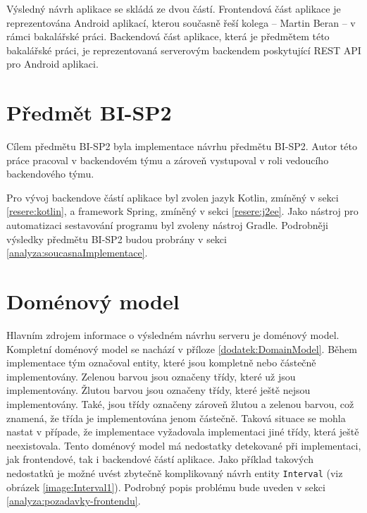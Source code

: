     Výsledný návrh aplikace se skládá ze dvou částí. Frontendová část aplikace je reprezentována Android aplikací, kterou současně řeší kolega -- Martin Beran -- v rámci bakalářské práci. Backendová část aplikace, která je předmětem této bakalářské práci, je reprezentovaná serverovým backendem poskytující REST API pro Android aplikaci.


\section{Předmět BI-SP2}\label{analyza:navrh:sp2}
    Cílem předmětu BI-SP2 byla implementace návrhu předmětu BI-SP2. Autor této práce pracoval v backendovém týmu a zároveň vystupoval v roli vedoucího backendového týmu.
    
    Pro vývoj backendove částí aplikace byl zvolen jazyk Kotlin, zmíněný v sekci \ref{resere:kotlin}, a framework Spring, zmíněný v sekci \ref{resere:j2ee}. Jako nástroj pro automatizaci sestavování programu byl zvoleny nástroj Gradle. Podrobněji výsledky předmětu BI-SP2 budou probrány v sekci \ref{analyza:soucasnaImplementace}.
        
    
\section{Doménový model}\label{analyza:navrh:DomainModel}
    Hlavním zdrojem informace o výsledném návrhu serveru je doménový model. Kompletní doménový model se nachází v příloze \ref{dodatek:DomainModel}. Během implementace tým označoval entity, které jsou kompletně nebo částečně implementovány. Zelenou barvou jsou označeny třídy, které už jsou implementovány. Žlutou barvou jsou označeny třídy, které ještě nejsou implementovány. Také, jsou třídy označeny zároveň žlutou a zelenou barvou, což znamená, že třída je implementována jenom částečně. Taková situace se mohla nastat v případe, že implementace vyžadovala implementaci jiné třídy, která ještě neexistovala. Tento doménový model má nedostatky detekované při implementaci, jak frontendové, tak i backendové částí aplikace. Jako příklad takových nedostatků je možné uvést zbytečně komplikovaný návrh entity \texttt{Interval} (viz obrázek \ref{image:Interval1}). Podrobný popis problému bude uveden v sekci \ref{analyza:pozadavky-frontendu}.

